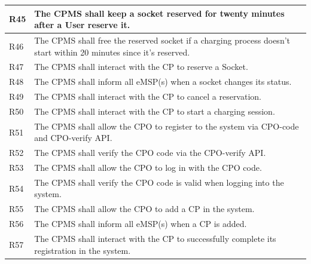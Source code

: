 \documentclass{Configuration_Files/PoliMi3i_thesis}
\begin{document}
\begin{xltabular}{\textwidth}{| >{}l | X |}
\hline
R45 &
    The CPMS shall keep a socket reserved for twenty minutes after a User reserve it.\B\\
\hline

R46 &
    The CPMS shall free the reserved socket if a charging process doesn’t start within 20 minutes since it's reserved.\B\\
\hline

R47 &
    The CPMS shall interact with the CP to reserve a Socket.\B\\
\hline

R48 &
    The CPMS shall inform all eMSP(s) when a socket changes its status.\B\\
\hline

R49 &
    The CPMS shall interact with the CP to cancel a reservation.\B\\
\hline



R50 &
    The CPMS shall interact with the CP to start a charging session.\B\\
\hline

R51 &
    The CPMS shall allow the CPO to register to the system via CPO-code and CPO-verify API.\B\\
\hline

R52 &
    The CPMS shall verify the CPO code via the CPO-verify API.\B\\
\hline
    
R53 &
     The CPMS shall allow the CPO to log in with the CPO code.\B\\
\hline
R54 &
     The CPMS shall verify the CPO code is valid when logging into the system.\B\\
\hline

R55 &
    The CPMS shall allow the CPO to add a CP in the system.\B\\
\hline

R56 &
    The CPMS shall inform all eMSP(s) when a CP is added.\B\\
\hline
    
R57 &
    The CPMS shall interact with the CP to successfully complete its registration in the system.\B\\
\hline


\end{xltabular}
\end{document}
